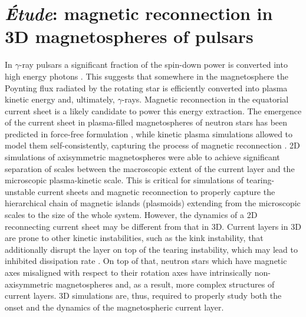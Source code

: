 \newcommand\runit{{\hat{\bm{r}}}}
\newcommand\thetaunit{{\hat{\bm{\theta}}}}
\newcommand\phiunit{{\hat{\bm{\phi}}}}

\chapter{{\it \'Etude}: magnetic reconnection in 3D magnetospheres of pulsars}

\label{ch:pulsar}

In $\gamma$-ray pulsars a significant fraction of the spin-down power  is converted into high energy photons \citep{2013ApJS..208...17A}. This suggests that somewhere in the magnetosphere the Poynting flux radiated by the rotating star is efficiently converted into plasma kinetic energy and, ultimately, $\gamma$-rays. Magnetic reconnection in the equatorial current sheet is a likely candidate to power this energy extraction. The emergence of the current sheet in plasma-filled magnetospheres of neutron stars has been predicted in force-free formulation \citep{1999ApJ...511..351C, 2006ApJ...648L..51S}, while kinetic plasma simulations allowed to model them self-consistently, capturing the process of magnetic reconnection \citep{2014ApJ...785L..33P,2014ApJ...795L..22C,2015MNRAS.448..606C,2015MNRAS.449.2759B,2020A&A...642A.204C}. 2D simulations of axisymmetric magnetospheres were able to achieve significant separation of scales between the macroscopic extent of the current layer and the microscopic plasma-kinetic scale. This is critical for simulations of tearing-unstable current sheets and magnetic reconnection to properly capture the hierarchical chain of magnetic islands (plasmoids) extending from the microscopic scales to the size of the whole system. However, the dynamics of a 2D reconnecting current sheet may be different from that in 3D. Current layers in 3D are prone to other kinetic instabilities, such as the kink instability, that additionally disrupt the layer on top of the tearing instability, which may lead to inhibited dissipation rate \citep{2021arXiv210500009Z,2020arXiv200802743G,2021arXiv210602790W}. On top of that, neutron stars which have magnetic axes misaligned with respect to their rotation axes have intrinsically non-axisymmetric magnetospheres and, as a result, more complex structures of current layers. 3D simulations are, thus, required to properly study both the onset and the dynamics of the magnetospheric current layer.

